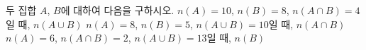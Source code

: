 두 집합 $A$, $B$에 대하여 다음을 구하시오.
 $n(A)=10$, $n(B)=8$, $n(A\cap B)=4$일 때, $n(A\cup B)$
 $n(A)=8$, $n(B)=5$, $n(A\cup B)=10$일 때, $n(A\cap B)$
 $n(A)=6$, $n(A\cap B)=2$, $n(A\cup B)=13$일 때, $n(B)$
